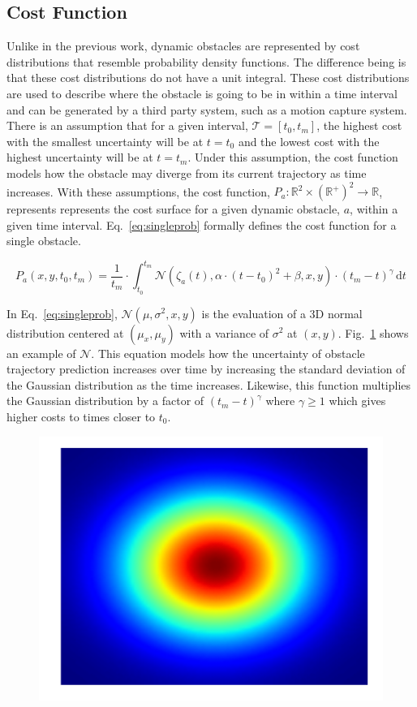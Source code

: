 \subsection{Cost Function}

\label{sec:cost}

Unlike in the previous work, dynamic obstacles are represented by cost
distributions that resemble probability density functions. The difference being
is that these cost distributions do not have a unit integral. These cost
distributions are used to describe where the obstacle is going to be in within
a time interval and can be generated by a third party system, such as a motion
capture system. There is an assumption that for a given interval, $\mathcal{T}
= [t_0, t_m]$, the highest cost with the smallest uncertainty will be at $t =
t_0$ and the lowest cost with the highest uncertainty will be at $t = t_m$.
Under this assumption, the cost function models how the obstacle may diverge
from its current trajectory as time increases. With these assumptions, the cost
function, $P_a: \mathbb{R}^2 \times (\mathbb{R}^+)^2 \rightarrow
\mathbb{R}$, represents represents the cost surface for a given dynamic
obstacle, $a$,  within a given time interval. Eq.~\ref{eq:singleprob} formally
defines the cost function for a single obstacle.


\begin{equation}
    P_a(x, y, t_0, t_m) = \frac{1}{t_m} \cdot \int^{t_m}_{t_0}
    \mathcal{N}(\zeta_a(t), \alpha \cdot (t - t_0)^2 + \beta, x, y) \cdot
    (t_m - t)^{\gamma} \,\mathrm{d}t
    \label{eq:singleprob}
\end{equation}

In Eq.~\ref{eq:singleprob}, $\mathcal{N}(\mu, \sigma^2, x, y)$ is the
evaluation of a 3D normal distribution centered at $(\mu_x, \mu_y)$ with a
variance of $\sigma^2$ at $(x, y)$. Fig.~\ref{fig:normal_3d} shows an example
of $\mathcal{N}$. This equation models how the uncertainty of obstacle
trajectory prediction increases over time by increasing the standard deviation
of the Gaussian distribution as the time increases.  Likewise, this function
multiplies the Gaussian distribution by a factor of $(t_m - t)^{\gamma}$ where
$\gamma \geq 1$ which gives higher costs to times closer to $t_0$.

\begin{figure}[h!]
    \centering
    \includegraphics[width=0.60\linewidth]{figs/normal_3d}
    \caption{}
    \label{fig:normal_3d}
\end{figure}

